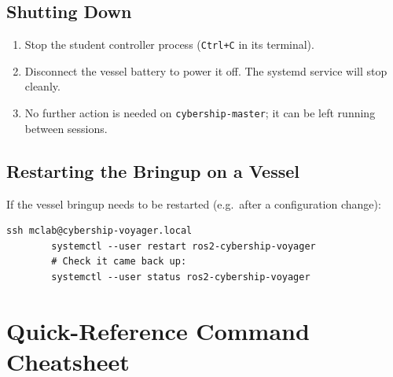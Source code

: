 \documentclass[12pt,a4paper]{article}
\begin{document}
	\subsection{Shutting Down}
	\label{ssec:shutdown}
	
	\begin{enumerate}
		\item Stop the student controller process (\texttt{Ctrl+C} in its terminal).
		\item Disconnect the vessel battery to power it off. The systemd service will stop cleanly.
		\item No further action is needed on \texttt{cybership-master}; it can be left running
		between sessions.
	\end{enumerate}
	
	\subsection{Restarting the Bringup on a Vessel}
	\label{ssec:restart-bringup}
	
	If the vessel bringup needs to be restarted (e.g.\ after a configuration change):
	
	\begin{lstlisting}[style=bash]
		ssh mclab@cybership-voyager.local
		systemctl --user restart ros2-cybership-voyager
		# Check it came back up:
		systemctl --user status ros2-cybership-voyager
	\end{lstlisting}
	
	\appendix
	\section{Quick-Reference Command Cheatsheet}
	\label{app:cheatsheet}
	
\end{document}
